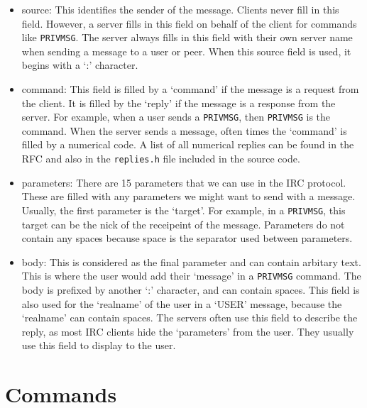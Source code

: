 \documentclass[letterpaper,twocolumn,10pt]{article}
\begin{document}
\begin{itemize}

	\item source: This identifies the sender of the message. Clients never fill
	      in this
	      field. However, a server fills in this field on behalf of the client
	      for
	      commands like \verb|PRIVMSG|. The server always fills in this field
	      with their
	      own server name when sending a message to a user or peer. When this
	      source
	      field is used, it begins with a `:' character.
	\item command: This field is filled by a `command' if the message is a
	      request from
	      the client. It is filled by the `reply' if the message is a response
	      from the
	      server. For example, when a user sends a \verb|PRIVMSG|, then
	      \verb|PRIVMSG| is
	      the command. When the server sends a message, often times the `command'
	      is
	      filled by a numerical code. A list of all numerical replies can be
	      found in the
	      RFC and also in the \verb|replies.h| file included in the source code.
	\item parameters: There are 15 parameters that we can use in the IRC
	      protocol.
	      These are filled with any parameters we might want to send with a
	      message.
	      Usually, the first parameter is the `target'. For example, in a
	      \verb|PRIVMSG|,
	      this target can be the nick of the receipeint of the message.
	      Parameters do not
	      contain any spaces because space is the separator used between
	      parameters.
	\item body: This is considered as the final parameter and can contain
	      arbitary
	      text. This is where the user would add their `message' in a
	      \verb|PRIVMSG|
	      command. The body is prefixed by another `:' character, and can contain
	      spaces.
	      This field is also used for the `realname' of the user in a `USER'
	      message,
	      because the `realname' can contain spaces. The servers often use this
	      field to
	      describe the reply, as most IRC clients hide the `parameters' from the
	      user.
	      They usually use this field to display to the user.

\end{itemize}

\section{Commands}
\end{document}

